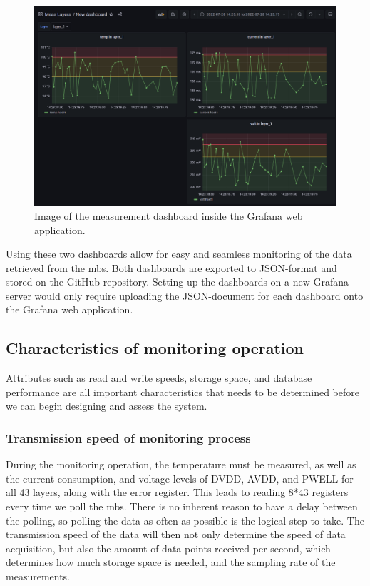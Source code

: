 \documentclass[main.tex]{subfiles}
\begin{document}
\begin{figure}[!htpb]
    \centering
    \includegraphics[width=15cm, scale=4]{images/grafana_2nd_dashboard.png}
    \caption{Image of the measurement dashboard inside the Grafana web application.}
    \label{fig: grafana second}
\end{figure}
\FloatBarrier

Using these two dashboards allow for easy and seamless monitoring of the data retrieved from the \gls{mb}s. Both dashboards are exported to JSON-format and stored on the GitHub repository. Setting up the dashboards on a new Grafana server would only require uploading the JSON-document for each dashboard onto the Grafana web application.



\subsection{Characteristics of monitoring operation}
\label{ssec: char_mon}
Attributes such as read and write speeds, storage space, and database performance are all important characteristics that needs to be determined before we can begin designing and assess the system.

\subsubsection{Transmission speed of monitoring process}
During the monitoring operation, the temperature must be measured, as well as the current consumption, and voltage levels of DVDD, AVDD, and PWELL for all 43 layers, along with the error register. This leads to reading 8*43 registers every time we poll the \gls{mb}s. There is no inherent reason to have a delay between the polling, so polling the data as often as possible is the logical step to take. The transmission speed of the data will then not only determine the speed of data acquisition, but also the amount of data points received per second, which determines how much storage space is needed, and the sampling rate of the measurements.
\end{document}
